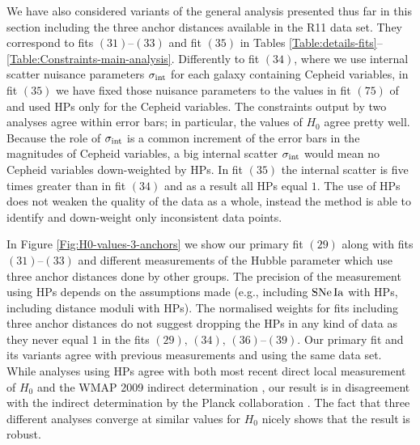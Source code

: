 We have also considered variants of the general analysis presented thus far in this section including the three anchor distances available in the R11 data set. They correspond to fits $(31)$--$(33)$ and fit $(35)$ in Tables \ref{Table:details-fits}--\ref{Table:Constraints-main-analysis}. Differently to fit $(34)$, where we use internal scatter nuisance parameters $\sigma_{\mathrm{int}}$ for each galaxy containing Cepheid variables, in fit $(35)$  we have fixed those nuisance parameters to the values in fit $(75)$ of \cite{Efstathiou:2013via} and used HPs only for the Cepheid variables. The constraints output by two analyses agree within error bars; in particular, the values of $H_0$ agree pretty well. Because the role of $\sigma_{\mathrm{int}}$ is a common increment of the error bars in the magnitudes of Cepheid variables, a big internal scatter $\sigma_{\mathrm{int}}$ would mean no Cepheid variables down-weighted by HPs. In fit $(35)$ the internal scatter is five times greater than in fit $(34)$ and as a result all HPs equal $1$. The use of HPs does not weaken the quality of the data as a whole, instead the method is able to identify and down-weight only inconsistent data points. 
 
In Figure \ref{Fig:H0-values-3-anchors} we show our primary fit $(29)$ along with fits $(31)$--$(33)$ and different measurements of the Hubble parameter which use three anchor distances done by other groups. The precision of the measurement using HPs depends on the assumptions made (e.g., including $\mathrm{SNe\,Ia}$ with HPs, including distance moduli with HPs). The normalised weights for fits including three anchor distances do not suggest dropping the HPs in any kind of data as they never equal $1$ in the fits $(29),\,(34),\,(36)$--$(39)$. Our primary fit and its variants agree with previous measurements \cite{Riess:2011yx} and \cite{Efstathiou:2013via} using the same data set. While analyses using HPs agree with both most recent direct local measurement of $H_0$ \cite{Riess:2016jrr} and the WMAP 2009 indirect determination \cite{Hinshaw:2012aka}, our result is in disagreement with the indirect determination by the Planck collaboration \cite{Ade:2015xua}. The fact that three different analyses converge at similar values for $H_0$ nicely shows that the result is robust. 

